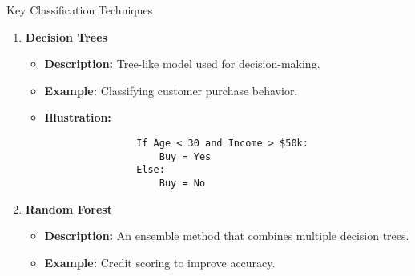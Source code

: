 \documentclass[aspectratio=169]{beamer}
\begin{document}
\begin{frame}[fragile]{Key Classification Techniques}
    \begin{enumerate}
        \item \textbf{Decision Trees}
            \begin{itemize}
                \item \textbf{Description:} Tree-like model used for decision-making.
                \item \textbf{Example:} Classifying customer purchase behavior.
                \item \textbf{Illustration:}
                \begin{lstlisting}
                If Age < 30 and Income > $50k:
                    Buy = Yes
                Else:
                    Buy = No
                \end{lstlisting}
            \end{itemize}

        \item \textbf{Random Forest}
            \begin{itemize}
                \item \textbf{Description:} An ensemble method that combines multiple decision trees.
                \item \textbf{Example:} Credit scoring to improve accuracy.
            \end{itemize}
    \end{enumerate}
\end{frame}
\end{document}

